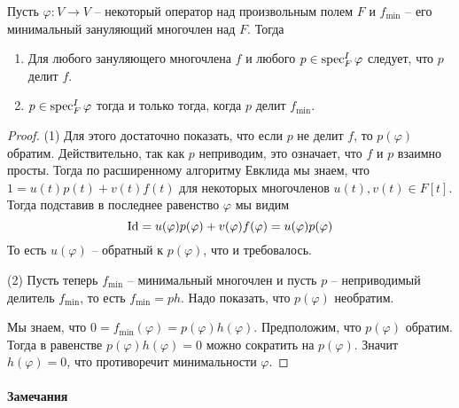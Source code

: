 \begin{claim}
Пусть $\varphi\colon V\to V$ -- некоторый оператор над произвольным полем $F$ и $f_\text{min}$ -- его минимальный зануляющий многочлен над $F$.
Тогда
\begin{enumerate}
\item Для любого зануляющего многочлена $f$ и любого $p\in \operatorname{spec}_F^I \varphi$ следует, что $p$ делит $f$.

\item $p\in \operatorname{spec}_F^I \varphi$ тогда и только тогда, когда $p$ делит $f_{\text{min}}$.
\end{enumerate}
\end{claim}
\begin{proof}
(1) Для этого достаточно показать, что если $p$ не делит $f$, то $p(\varphi)$ обратим.
Действительно, так как $p$ неприводим, это означает, что $f$ и $p$ взаимно просты.
Тогда по расширенному алгоритму Евклида мы знаем, что $1 = u(t) p(t) + v(t) f(t)$ для некоторых многочленов $u(t), v(t)\in F[t]$.
Тогда подставив в последнее равенство $\varphi$ мы видим 
\[
\operatorname{Id} = u(\varphi) p(\varphi) + v(\varphi) f(\varphi) = u(\varphi) p(\varphi)
\]
То есть $u(\varphi)$ -- обратный к $p(\varphi)$, что и требовалось.

(2) Пусть теперь $f_\text{min}$ -- минимальный многочлен и пусть $p$ -- неприводимый делитель $f_\text{min}$, то есть $f_\text{min} = p h$.
Надо показать, что $p(\varphi)$ необратим.

Мы знаем, что $0 = f_\text{min}(\varphi) = p(\varphi) h(\varphi)$.
Предположим, что $p(\varphi)$ обратим.
Тогда в равенстве $p(\varphi)h(\varphi) = 0$ можно сократить на $p(\varphi)$.
Значит $h(\varphi) = 0$, что противоречит минимальности $\varphi$.
\end{proof}

\paragraph{Замечания}

